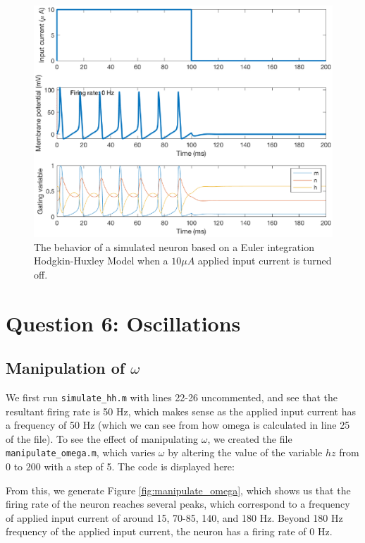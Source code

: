 \documentclass[11pt, oneside]{article}
\begin{document}
\begin{figure}[ht!]
\centering
\includegraphics[width=1\textwidth]{5d.eps}
\caption{The behavior of a simulated neuron based on a Euler integration Hodgkin-Huxley Model when a $10\mu A$ applied input current is turned off.}
\label{fig:5d}
\end{figure}

\section{Question 6: Oscillations}

\subsection{Manipulation of $\omega$}

We first run \lstinline{simulate_hh.m} with lines 22-26 uncommented, and see that the resultant firing rate is 50 Hz, which makes sense as the applied input current has a frequency of 50 Hz (which we can see from how omega is calculated in line 25 of the file). To see the effect of manipulating $\omega$, we created the file \lstinline{manipulate_omega.m}, which varies $\omega$ by altering the value of the variable $hz$ from $0$ to $200$ with a step of 5. The code is displayed here:

From this, we generate Figure \ref{fig:manipulate_omega}, which shows us that the firing rate of the neuron reaches several peaks, which correspond to a frequency of applied input current of around 15, 70-85, 140, and 180 Hz. Beyond 180 Hz frequency of the applied input current, the neuron has a firing rate of 0 Hz.
\end{document}
